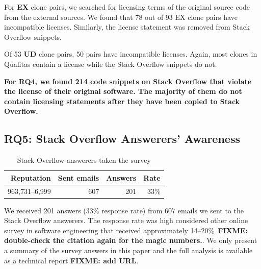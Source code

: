 \documentclass[10pt,journal,compsoc]{IEEEtran}
\newcommand\FIXME[1]{{\color{red}\textbf{FIXME: #1}}}
\begin{document}
For \textbf{EX}
clone pairs, we searched for licensing terms of the original source code from
the external sources. We found that 78 out of 93 EX clone pairs have
incompatible licenses. %
Similarly, the license statement was removed from Stack Overflow snippets. 

Of 53 \textbf{UD} clone pairs, 50 pairs have incompatible licenses. Again, most
clones in Qualitas contain a license while the Stack Overflow snippets do not.
%

\textbf{For RQ4, we found 214 code snippets on Stack Overflow that
	violate the license of their original software. The majority of them
	do not contain licensing statements after they have been copied to
	Stack Overflow.}

\subsection{RQ5: Stack Overflow Answerers' Awareness}

\begin{table}
	\centering
	\caption{Stack Overflow answerers taken the survey}
	\label{tab:survey_target}
	\begin{tabular}{rrrr}
		\toprule
		Reputation & Sent emails & Answers & Rate \\
		\midrule
		963,731--6,999 & 607 & 201 & 33\% \\
		\bottomrule
	\end{tabular}
\end{table}

We received 201 answers (33\% response rate) from 607 emails we sent to the
Stack Overflow answerers. The response rate was high
considered other online survey in software engineering that received
approximately 14--20\%~\FIXME{double-check the citation again for the magic
	numbers.}\cite{Punter2003}.
We only present a summary of the survey answers in
this paper and the full analysis is available as a technical report \FIXME{add URL}.
\end{document}
